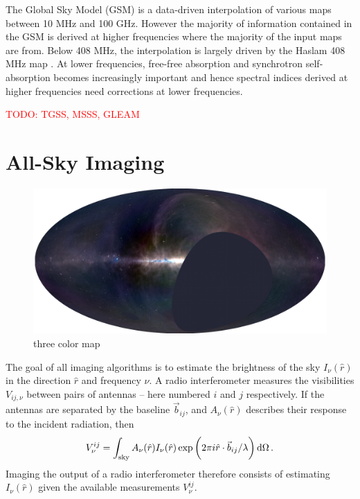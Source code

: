 \documentclass[twocolumn]{aastex6}
\renewcommand{\d}{{\rm d}}
\newcommand{\todo}[1]{\textcolor{red}{TODO: #1}\PackageWarning{TODO:}{#1!}}
\begin{document}
The Global Sky Model (GSM) \citep{2008MNRAS.388..247D, 2017MNRAS.464.3486Z} is a data-driven
interpolation of various maps between 10 MHz and 100 GHz. However the majority of information
contained in the GSM is derived at higher frequencies where the majority of the input maps are from.
Below 408 MHz, the interpolation is largely driven by the Haslam 408 MHz map
\citep{1981A&A...100..209H, 1982A&AS...47....1H}.  At lower frequencies, free-free absorption and
synchrotron self-absorption becomes increasingly important and hence spectral indices derived at
higher frequencies need corrections at lower frequencies.





\citet{2011A&A...525A.138G}


\todo{TGSS, MSSS, GLEAM}

\section{All-Sky Imaging}

\begin{figure}[ht]
    \includegraphics[width=\textwidth]{maps/rgb-map-small}
    \caption{three color map}
    \label{fig:rgb}
\end{figure}

The goal of all imaging algorithms is to estimate the brightness of the sky $I_\nu(\hat r)$ in the
direction $\hat r$ and frequency $\nu$. A radio interferometer measures the visibilities
$V_{ij,\nu}$ between pairs of antennas -- here numbered $i$ and $j$ respectively. If the antennas
are separated by the baseline $\vec b_{ij}$, and $A_\nu(\hat r)$ describes their response to the
incident radiation, then
\begin{equation}\label{eq:basic-imaging}
    V^{ij}_\nu = \int_\text{sky}
                 A_\nu(\hat r) I_\nu(\hat r)
                 \exp\bigg(2\pi i \hat r\cdot\vec b_{ij}/\lambda\bigg) \,\d\Omega \, .
\end{equation}
Imaging the output of a radio interferometer therefore consists of estimating $I_\nu(\hat r)$ given
the available measurements $V^{ij}_\nu$.
\end{document}
